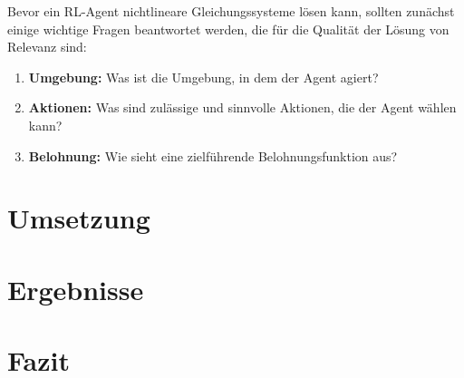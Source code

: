 \documentclass{article}
\theoremstyle{newline}
\begin{document}
\begin{onehalfspace}
Bevor ein RL-Agent nichtlineare Gleichungssysteme lösen kann, sollten zunächst einige wichtige Fragen beantwortet werden, die für die Qualität der Lösung von Relevanz sind:

\begin{enumerate}
	\item \textbf{Umgebung:} Was ist die Umgebung, in dem der Agent agiert?
	\item \textbf{Aktionen:} Was sind zulässige und sinnvolle Aktionen, die der Agent wählen kann?
	\item \textbf{Belohnung:} Wie sieht eine zielführende Belohnungsfunktion aus?
\end{enumerate}


\section{Umsetzung}

\section{Ergebnisse}

\section{Fazit}



\end{onehalfspace}
\end{document}
